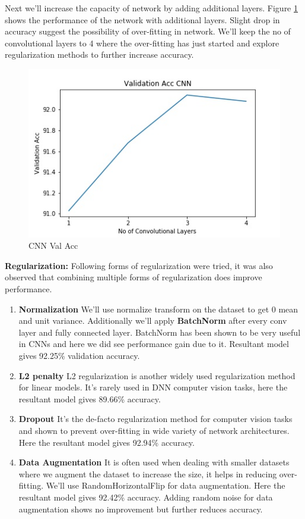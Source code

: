 \documentclass[10pt,a4paper]{article}
\begin{document}
	Next we'll increase the capacity of network by adding additional layers. Figure \ref{mlpval} shows the performance of the network with additional layers. Slight drop in accuracy suggest the possibility of over-fitting in network. We'll keep the no of convolutional layers to 4 where the over-fitting has just started and explore regularization methods to further increase accuracy.

\begin{figure}[h!]
\begin{center}
	\includegraphics[width=0.85\linewidth]{val_cnn.jpg}
	\caption{CNN Val Acc}
	\label{mlpval}
\end{center}
\end{figure}
	
\textbf{Regularization:} Following forms of regularization were tried, it was also observed that combining multiple forms of regularization does improve performance.\\

\begin{enumerate}
\item \textbf{Normalization} We'll use normalize transform on the dataset to get 0 mean and unit variance. Additionally we'll apply \textbf{BatchNorm} after every conv layer and fully connected layer. BatchNorm has been shown to be very useful in CNNs and here we did see performance gain due to it. Resultant model gives 92.25\% validation accuracy. 

\item \textbf{L2 penalty} L2 regularization is another widely used regularization method for linear models. It's rarely used in DNN computer vision tasks, here the resultant model gives 89.66\% accuracy.

\item \textbf{Dropout} It's the de-facto regularization method for computer vision tasks and shown to prevent over-fitting in wide variety of network architectures. Here the resultant model gives 92.94\% accuracy.

\item \textbf{Data Augmentation} It is often used when dealing with smaller datasets where we augment the dataset to increase the size, it helps in reducing over-fitting. We'll use RandomHorizontalFlip for data augmentation. Here the resultant model gives 92.42\% accuracy. Adding random noise for data augmentation shows no improvement but further reduces accuracy.

\end{enumerate}
\end{document}
